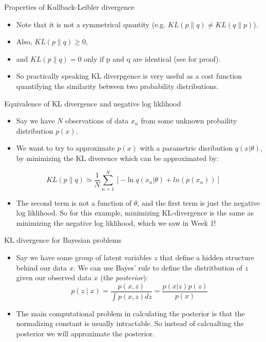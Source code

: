 \documentclass{beamer}
\begin{document}
\begin{frame}{Properties of Kullback-Leibler divergence}
  \begin{itemize}
  \item Note that it is not a symmetrical quantity (e.g. $KL(p\|q) \ne KL(q\|p)$).
  \item Also, $KL(p\|q) \ge 0$,
  \item and $KL(p\|q) = 0$ only if p and q are identical (see \cite{bishop} for proof).
  \item So practically speaking KL diverpgence is very useful as a cost function quantifying the similarity between two probability distributions.
  \end{itemize}
\end{frame}

\begin{frame}{Equivalence of KL divergence and negative log liklihood}
  \begin{itemize}
  \item Say we have $N$ observations of data $x_n$ from some unknown probaility distribution $p(x)$.
  \item We want to try to approximate $p(x)$ with a parametric disribution $q(x|\theta)$, by minimizing the KL diverence which can be approximated by:
  \end{itemize}
  \begin{equation}
    KL(p\|q) \simeq \frac{1}{N} \sum_{n=1}^{N} \left[ -\ln q(x_n | \theta) + ln(p (x_n))\right]
  \end{equation}
  \begin{itemize}
  \item The second term is not a function of $\theta$, and the first term is just the negative log liklihood. So for this example, minimizing KL-divergence is the same as minimizing the negative log liklihood, which we saw in Week 1!
  \end{itemize}
\end{frame}

\begin{frame}{KL divergence for Bayesian problems}
  \begin{itemize}
  \item Say we have some group of latent variables $z$ that define a hidden structure behind our data $x$. We can use Bayes' rule to define the distritbution of $z$ given our observed data $x$ (the \textit{posterior}):
    \[p(z \mid x) = \frac{p(x, z)}{\int p(x, z) dz} = \frac{p(x|z) p(z)}{p(x)}\]
  \item The main computational problem in calculating the posterior is that the normalizing constant is usually intractable. So instead of calcualting the posterior we will approximate the posterior.
  \end{itemize}
\end{frame}
\end{document}
